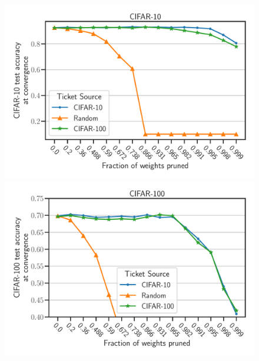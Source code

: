 \documentclass{article}
\begin{document}
\begin{figure}[]
    \centering
    \begin{minipage}{.497\textwidth}
    \includegraphics[width=\textwidth]{plots/Exp2_VGG_CIFAR10_N.pdf}
    \end{minipage}
    \begin{minipage}{.497\textwidth}
    \includegraphics[width=\textwidth]{plots/Exp2_VGG_CIFAR100_N1.pdf}
    \end{minipage}
    \begin{minipage}{.497\textwidth}
   

\end{minipage}
\end{figure}
\end{document}
